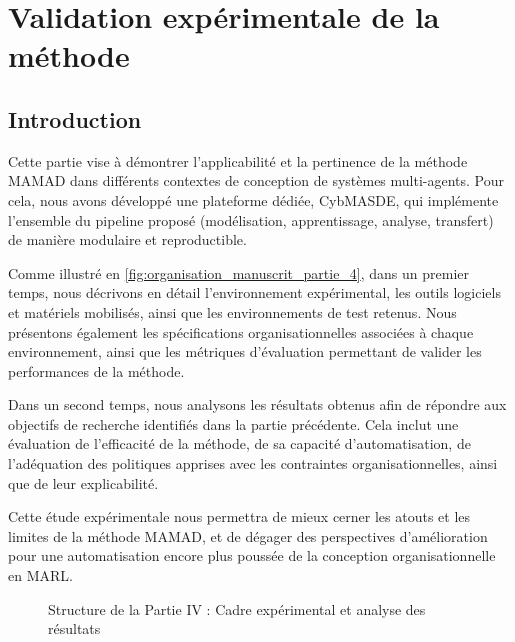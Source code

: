 \cleardoublepage
{}
\part{Validation expérimentale de la méthode}

\chapter*{Introduction}
\label{part:experimentation}


\noindent
Cette partie vise à démontrer l'applicabilité et la pertinence de la méthode \ac{MAMAD} dans différents contextes de conception de systèmes multi-agents. Pour cela, nous avons développé une plateforme dédiée, \ac{CybMASDE}, qui implémente l'ensemble du pipeline proposé (modélisation, apprentissage, analyse, transfert) de manière modulaire et reproductible.

\medskip

\noindent
Comme illustré en \autoref{fig:organisation_manuscrit_partie_4}, dans un premier temps, nous décrivons en détail l'environnement expérimental, les outils logiciels et matériels mobilisés, ainsi que les environnements de test retenus. Nous présentons également les spécifications organisationnelles associées à chaque environnement, ainsi que les métriques d'évaluation permettant de valider les performances de la méthode.

\medskip

\noindent
Dans un second temps, nous analysons les résultats obtenus afin de répondre aux objectifs de recherche identifiés dans la partie précédente. Cela inclut une évaluation de l'efficacité de la méthode, de sa capacité d'automatisation, de l'adéquation des politiques apprises avec les contraintes organisationnelles, ainsi que de leur explicabilité.

\medskip

\noindent
Cette étude expérimentale nous permettra de mieux cerner les atouts et les limites de la méthode \ac{MAMAD}, et de dégager des perspectives d'amélioration pour une automatisation encore plus poussée de la conception organisationnelle en \ac{MARL}.



\begin{figure}[h!]
    \centering
    \resizebox{\linewidth}{!}{%
        
    }
    \caption{Structure de la Partie IV : Cadre expérimental et analyse des résultats}
    \label{fig:organisation_manuscrit_partie_4}
\end{figure}

